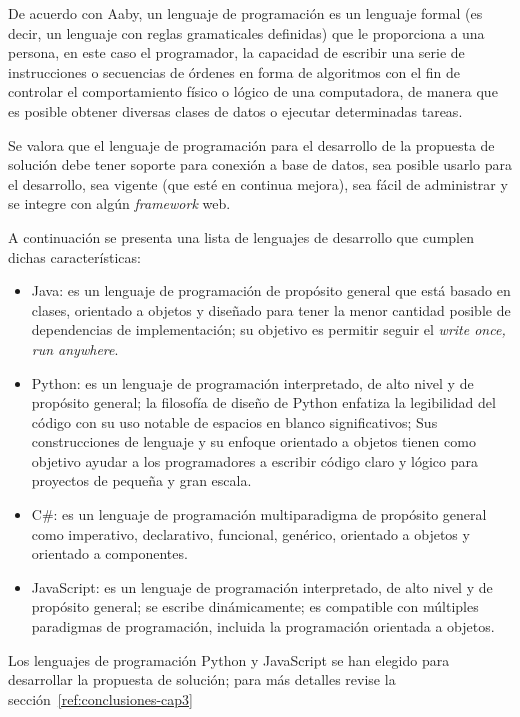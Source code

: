 De acuerdo con Aaby\cite{aaby_introduction_1996}, un lenguaje de programación es un lenguaje formal (es decir, un lenguaje con reglas gramaticales definidas) que le proporciona a una persona, en este caso el programador, la capacidad de escribir una serie de instrucciones o secuencias de órdenes en forma de algoritmos con el fin de controlar el comportamiento físico o lógico de una computadora, de manera que es posible obtener diversas clases de datos o ejecutar determinadas tareas.


Se valora que el lenguaje de programación para el desarrollo de la propuesta de solución debe tener soporte para conexión a base de datos, sea posible usarlo para el desarrollo, sea vigente (que esté en continua mejora), sea fácil de administrar y se integre con algún \textit{framework} web.


A continuación se presenta una lista de lenguajes de desarrollo que cumplen dichas características:

\begin{itemize}
    \item Java: es un lenguaje de programación de propósito general que está basado en clases, orientado a objetos y diseñado para tener la menor cantidad posible de dependencias de implementación; su objetivo es permitir seguir el  \textit{write once, run anywhere}\cite{joy_java_2000}.
    \item Python: es un lenguaje de programación interpretado, de alto nivel y de propósito general; la filosofía de diseño de Python enfatiza la legibilidad del código con su uso notable de espacios en blanco significativos; Sus construcciones de lenguaje y su enfoque orientado a objetos tienen como objetivo ayudar a los programadores a escribir código claro y lógico para proyectos de pequeña y gran escala\cite{van_rossum_python_2007}.
    \item C\#: es un lenguaje de programación multiparadigma de propósito general como imperativo, declarativo, funcional, genérico, orientado a objetos y orientado a componentes\cite{hejlsberg_c_2003}.
    \item JavaScript: es un lenguaje de programación interpretado, de alto nivel y de propósito general; se escribe dinámicamente; es compatible con múltiples paradigmas de programación, incluida la programación orientada a objetos\cite{noauthor_javascript_nodate}.
\end{itemize}

Los lenguajes de programación Python y JavaScript se han elegido para desarrollar la propuesta de solución; para más detalles revise la sección~\ref{ref:conclusiones-cap3}

